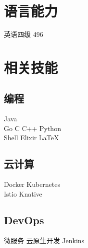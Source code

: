 \documentclass[]{deedy-resume-openfont}
\begin{document}
\begin{minipage}[t]{0.3\textwidth}
\sectionsep

\section{语言能力}
\sectionsep
英语四级 496 \\
\sectionsep


\section{相关技能}
\sectionsep
\subsection{编程}
Java   \\
Go \textbullet{} C \textbullet{} C++ \textbullet{}  Python  \\
Shell \textbullet{} Elixir \textbullet{} \LaTeX\ \\ 
\sectionsep

\subsection{云计算}
Docker \textbullet{} Kubernetes   \\
Istio \textbullet{} Knative  \\
\sectionsep

\subsection{DevOps}
微服务 \textbullet{} 云原生开发 \textbullet{} Jenkins 
\sectionsep



%
%

\end{minipage}
\end{document}
